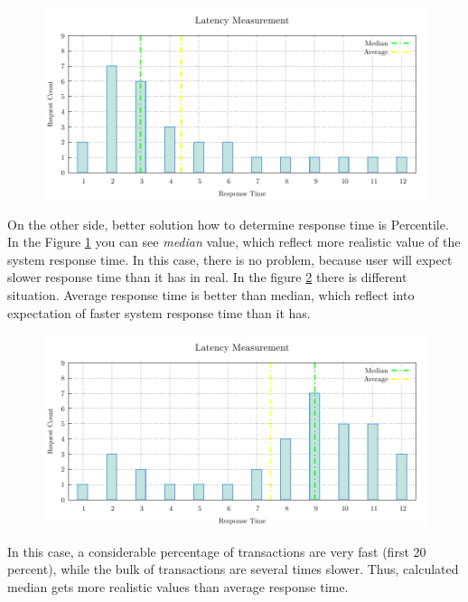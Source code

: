 \begin{figure}[H]
  \centering
  \includegraphics[width=15cm]{obrazky-figures/average_median_1.pdf}
  \caption{}
  \label{fig:average_percentil_1}
\end{figure}

On the other side, better solution how to determine response time is Percentile. In the Figure \ref{fig:average_percentil_1} you can see \emph{median} value, which reflect more realistic value of the system response time. In this case, there is no problem, because user will expect slower response time than it has in real. In the figure \ref{fig:average_percentil_2} there is different situation. Average response time is better than median, which reflect into expectation of faster system response time than it has.

\begin{figure}[H]
  \centering
  \includegraphics[width=15cm]{obrazky-figures/average_median_2.pdf}
  \caption{}
  \label{fig:average_percentil_2}
\end{figure}

In this case, a considerable percentage of transactions are very fast (first 20 percent), while the bulk of transactions are several times slower. Thus, calculated median gets more realistic values than average response time.

